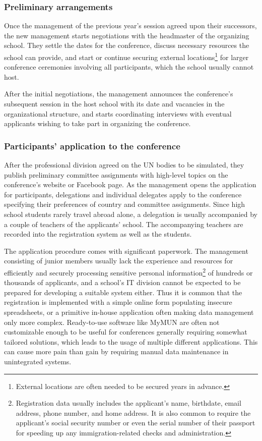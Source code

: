 \subsubsection{Preliminary arrangements}

Once the management of the previous year's session agreed upon their successors, the new management starts negotiations with the headmaster of the organizing school. They settle the dates for the conference, discuss necessary resources the school can provide, and start or continue securing external locations\footnote{External locations are often needed to be secured years in advance.} for larger conference ceremonies involving all participants, which the school usually cannot host.

After the initial negotiations, the management announces the conference's subsequent session in the host school with its date and vacancies in the organizational structure, and starts coordinating interviews with eventual applicants wishing to take part in organizing the conference.

\subsubsection{Participants' application to the conference}

After the professional division agreed on the UN bodies to be simulated, they publish preliminary committee assignments with high-level topics on the conference's website or Facebook page. As the management opens the application for participants, delegations and individual delegates apply to the conference specifying their preferences of country and committee assignments. Since high school students rarely travel abroad alone, a delegation is usually accompanied by a couple of teachers of the applicants' school. The accompanying teachers are recorded into the registration system as well as the students.

The application procedure comes with significant paperwork. The management consisting of junior members usually lack the experience and resources for efficiently and securely processing sensitive personal information\footnote{Registration data usually includes the applicant's name, birthdate, email address, phone number, and home address. It is also common to require the applicant's social security number or even the serial number of their passport for speeding up any immigration-related checks and administration.} of hundreds or thousands of applicants, and a school's IT division cannot be expected to be prepared for developing a suitable system either. Thus it is common that the registration is implemented with a simple online form populating insecure spreadsheets, or a primitive in-house application often making data management only more complex. Ready-to-use software like MyMUN are often not customizable enough to be useful for conferences generally requiring somewhat tailored solutions, which leads to the usage of multiple different applications. This can cause more pain than gain by requiring manual data maintenance in unintegrated systems.

